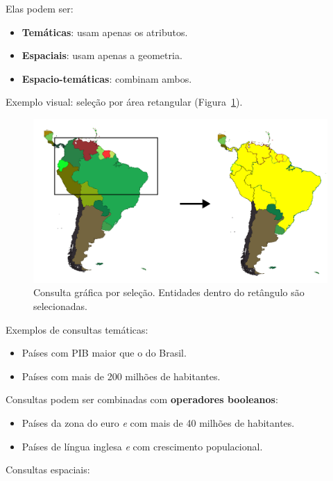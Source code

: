 Elas podem ser:

\begin{itemize}
 \item \textbf{Temáticas}: usam apenas os atributos.
 \item \textbf{Espaciais}: usam apenas a geometria.
 \item \textbf{Espacio-temáticas}: combinam ambos.
\end{itemize}

Exemplo visual: seleção por área retangular (Figura~\ref{Fig:Seleccion}).

\begin{figure}[!hbt]   
\centering
\includegraphics[width=\textwidth]{Bases_dados/Seleccion_rectangulo.png}
\caption{\small Consulta gráfica por seleção. Entidades dentro do retângulo são selecionadas.}
\label{Fig:Seleccion} 
\end{figure}

Exemplos de consultas temáticas:

\begin{itemize}
 \item Países com PIB maior que o do Brasil.
 \item Países com mais de 200 milhões de habitantes.
\end{itemize}

Consultas podem ser combinadas com \textbf{operadores booleanos}:

\begin{itemize}
 \item Países da zona do euro \emph{e} com mais de 40 milhões de habitantes.
 \item Países de língua inglesa \emph{e} com crescimento populacional.
\end{itemize}

Consultas espaciais:

